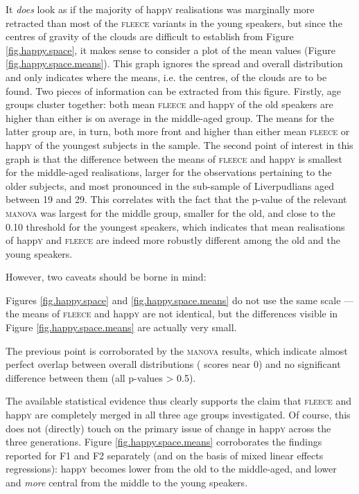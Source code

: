 It \emph{does} look as if the majority of happ\textsc{y} realisations was marginally more retracted than most of the \textsc{fleece} variants in the young speakers, but since the centres of gravity of the  clouds are difficult to establish from Figure \ref{fig.happy.space}, it makes sense to consider a plot of the mean values (Figure \ref{fig.happy.space.means}).
This graph ignores the spread and overall distribution and only indicates where the means, i.e. the centres, of the  clouds are to be found.
Two pieces of information can be extracted from this figure.
Firstly, age groups cluster together: both mean \textsc{fleece} and happ\textsc{y} of the old speakers are higher than either  is on average in the middle-aged group.
The means for the latter group are, in turn, both more front and higher than either mean \textsc{fleece} or happ\textsc{y} of the youngest subjects in the sample.
The second point of interest in this graph is that the difference between the means of \textsc{fleece} and happ\textsc{y} is smallest for the middle-aged realisations, larger for the observations pertaining to the older subjects, and most pronounced in the sub-sample of Liverpudlians aged between 19 and 29.
This correlates with the fact that the p-value of the relevant \textsc{manova} was largest for the middle group, smaller for the old, and close to the 0.10 threshold for the youngest speakers, which indicates that mean realisations of happ\textsc{y} and \textsc{fleece} are indeed more robustly different among the old and the young speakers.

However, two caveats should be borne in mind:
\begin{inparaenum}[(1)]
	\item Figures \ref{fig.happy.space} and \ref{fig.happy.space.means} do not use the same scale --- the means of \textsc{fleece} and happ\textsc{y} are not identical, but the differences visible in Figure \ref{fig.happy.space.means} are actually very small.
	\item The previous point is corroborated by the \textsc{manova} results, which indicate almost perfect overlap between overall distributions ( scores near 0) and no significant difference between them (all p-values > 0.5).
\end{inparaenum}
The available statistical evidence thus clearly supports the claim that \textsc{fleece} and happ\textsc{y} are completely merged in all three age groups investigated.
Of course, this does not (directly) touch on the primary issue of change in happ\textsc{y} across the three generations.
Figure \ref{fig.happy.space.means} corroborates the findings reported for F1 and F2 separately (and on the basis of mixed linear effects regressions): happ\textsc{y} becomes lower from the old to the middle-aged, and lower and \emph{more} central from the middle to the young speakers.

